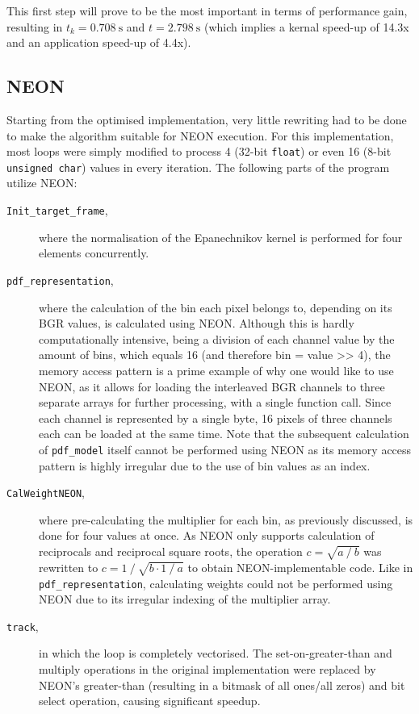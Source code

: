 \documentclass[final]{article}
\begin{document}
This first step will prove to be the most important in terms of performance gain, resulting in $t_k = \SI{0.708}{\second}$ and $t = \SI{2.798}{\second}$ (which implies a kernal speed-up of 14.3x and an application speed-up of 4.4x).

\subsection{NEON}
Starting from the optimised implementation, very little rewriting had to be done to make the algorithm suitable for NEON execution. For this implementation, most loops were simply modified to process 4 (32-bit \texttt{float}) or even 16 (8-bit \texttt{unsigned char}) values in every iteration. The following parts of the program utilize NEON:

\begin{description}
    \item[\texttt{Init\_target\_frame},] where the normalisation of the Epanechnikov kernel is performed for four elements concurrently.

    \item[\texttt{pdf\_representation},] where the calculation of the bin each pixel belongs to, depending on its BGR values, is calculated using NEON. Although this is hardly computationally intensive, being a division of each channel value by the amount of bins, which equals 16 (and therefore bin = value >> 4), the memory access pattern is a prime example of why one would like to use NEON, as it allows for loading the interleaved BGR channels to three separate arrays for further processing, with a single function call. Since each channel is represented by a single byte, 16 pixels of three channels each can be loaded at the same time.
    Note that the subsequent calculation of \texttt{pdf\_model} itself cannot be performed using NEON as its memory access pattern is highly irregular due to the use of bin values as an index.

    \item[\texttt{CalWeightNEON},] where pre-calculating the multiplier for each bin, as previously discussed, is done for four values at once. As NEON only supports calculation of reciprocals and reciprocal square roots, the operation $c = \sqrt{a \mathbin{/} b}$ was rewritten to $c = 1 \mathbin{/} \sqrt{b \cdot 1 \mathbin{/} a}$ to obtain NEON-implementable code. Like in \texttt{pdf\_representation}, calculating weights could not be performed using NEON due to its irregular indexing of the multiplier array.

    \item[\texttt{track},] in which the loop is completely vectorised. The set-on-greater-than and multiply operations in the original implementation were replaced by NEON's greater-than (resulting in a bitmask of all ones/all zeros) and bit select operation, causing significant speedup.
\end{description}
\end{document}
